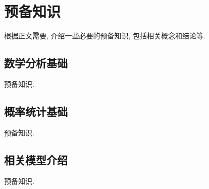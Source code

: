 \chapter{预备知识}

根据正文需要, 介绍一些必要的预备知识, 包括相关概念和结论等.

\section{数学分析基础}

预备知识.


\section{概率统计基础}

预备知识.

\section{相关模型介绍}

预备知识.